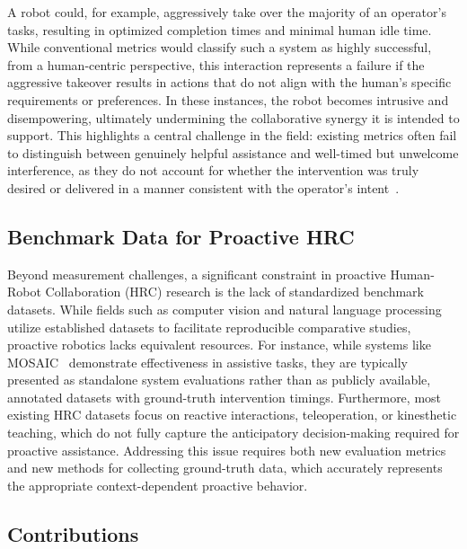 \documentclass[sensors,article,submit,pdftex,moreauthors]{Definitions/mdpi}
\begin{document}
A robot could, for example, aggressively take over the majority of an operator's tasks, resulting in optimized completion times and minimal human idle time. While conventional metrics would classify such a system as highly successful, from a human-centric perspective, this interaction represents a failure if the aggressive takeover results in actions that do not align with the human's specific requirements or preferences. In these instances, the robot becomes intrusive and disempowering, ultimately undermining the collaborative synergy it is intended to support. This highlights a central challenge in the field: existing metrics often fail to distinguish between genuinely helpful assistance and well-timed but unwelcome interference, as they do not account for whether the intervention was truly desired or delivered in a manner consistent with the operator's intent~\cite{Makris2023, Cotta2023}.

\subsection{Benchmark Data for Proactive HRC}

Beyond measurement challenges, a significant constraint in proactive Human-Robot Collaboration (HRC) research is the lack of standardized benchmark datasets. While fields such as computer vision and natural language processing utilize established datasets to facilitate reproducible comparative studies, proactive robotics lacks equivalent resources. For instance, while systems like MOSAIC~\cite{Wang2024} demonstrate effectiveness in assistive tasks, they are typically presented as standalone system evaluations rather than as publicly available, annotated datasets with ground-truth intervention timings. Furthermore, most existing HRC datasets focus on reactive interactions, teleoperation, or kinesthetic teaching, which do not fully capture the anticipatory decision-making required for proactive assistance. Addressing this issue requires both new evaluation metrics and new methods for collecting ground-truth data, which accurately represents the appropriate context-dependent proactive behavior.

\subsection{Contributions}
\end{document}
